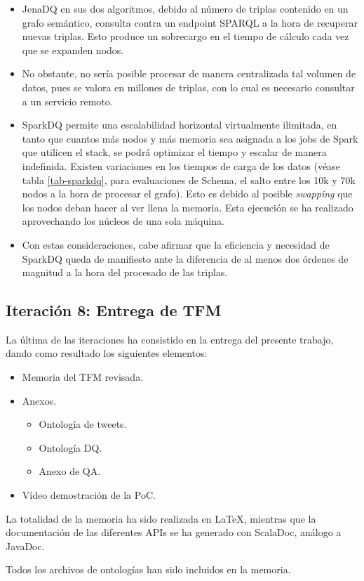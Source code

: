 \begin{itemize}
\item JenaDQ en sus dos algoritmos, debido al número de triplas contenido en un
  grafo semántico, consulta contra un endpoint \acs{SPARQL} a la hora de
  recuperar nuevas triplas. Esto produce un sobrecargo en el tiempo de cálculo
  cada vez que se expanden nodos. 
\item No obstante, no sería posible procesar de manera centralizada tal volumen
  de datos, pues se valora en millones de triplas, con lo cual es necesario
  consultar a un servicio remoto. 
\item SparkDQ permite una escalabilidad horizontal virtualmente ilimitada, en
  tanto que cuantos más nodos y más memoria sea asignada a los jobs de Spark que
  utilicen el stack, se podrá optimizar el tiempo y escalar de manera
  indefinida. Existen variaciones en los tiempos de carga de los datos (véase
  tabla \ref{tab-sparkdq}, para evaluaciones de Schema, el salto entre los 10k y
  70k nodos a la hora de procesar el grafo). Esto es debido al posible
  \textit{swapping} que los nodos deban hacer al ver llena la memoria. Esta
  ejecución se ha realizado aprovechando los núcleos de una sola máquina. 
\item Con estas consideraciones, cabe afirmar que la eficiencia y
  necesidad de SparkDQ queda de manifiesto ante la diferencia de al menos dos
  órdenes de magnitud a la hora del procesado de las triplas. 
\end{itemize}




\subsection{Iteración 8: Entrega de TFM}



La última de las iteraciones ha consistido en la entrega del
presente trabajo, dando como resultado los siguientes elementos: 

\begin{itemize}
\item Memoria del \acs{TFM} revisada.
\item Anexos.
  \begin{itemize}
  \item Ontología de tweets.
  \item Ontología \acs{DQ}.
  \item Anexo de \acs{QA}.
  \end{itemize}
\item Vídeo demostración de la \acs{PoC}.
\end{itemize}

La totalidad de la memoria ha sido realizada en \LaTeX, mientras que la
documentación de las diferentes \acs{API}s se ha generado con ScalaDoc, análogo
a JavaDoc. 

Todos los archivos de ontologías han sido incluidos en la memoria.
